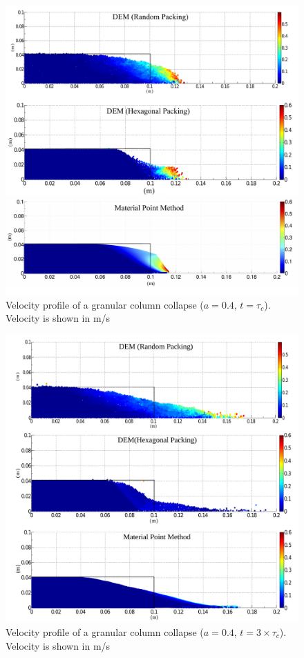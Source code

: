 \begin{figure}[tbhp]
\centering
\includegraphics[width=\textwidth]{a04tc}
\caption[Velocity profile of a granular column collapse ($a = 0.4$, 
$t=\tau_c$)]{Velocity profile of a granular column collapse ($a = 0.4$, 
$t=\tau_c$). Velocity is shown in m/s}
\label{fig:a04tc}
\end{figure}

\begin{figure}[tbhp]
\centering
\includegraphics[width=\textwidth]{a04f}
\caption[Velocity profile of a granular column collapse ($a = 0.4$, 
$t=\tau_c$)]{Velocity profile of a granular column collapse ($a = 0.4$,  
$t=3\times\tau_c$). Velocity is shown in m/s}
\label{fig:a04f}
\end{figure}


